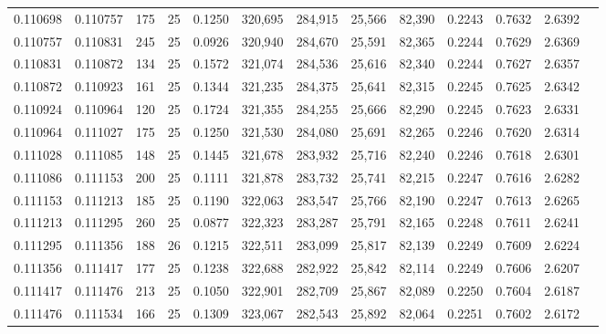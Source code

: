 \begin{tabular}{rrrrrrrrrrrrr}
0.110698 & 0.110757 &   175 &  25 &                                     0.1250 & 320,695 & 284,915 &  25,566 &  82,390 & 0.2243 & 0.7632 & 2.6392 \\
0.110757 & 0.110831 &   245 &  25 &                                     0.0926 & 320,940 & 284,670 &  25,591 &  82,365 & 0.2244 & 0.7629 & 2.6369 \\
0.110831 & 0.110872 &   134 &  25 &                                     0.1572 & 321,074 & 284,536 &  25,616 &  82,340 & 0.2244 & 0.7627 & 2.6357 \\
0.110872 & 0.110923 &   161 &  25 &                                     0.1344 & 321,235 & 284,375 &  25,641 &  82,315 & 0.2245 & 0.7625 & 2.6342 \\
0.110924 & 0.110964 &   120 &  25 &                                     0.1724 & 321,355 & 284,255 &  25,666 &  82,290 & 0.2245 & 0.7623 & 2.6331 \\
0.110964 & 0.111027 &   175 &  25 &                                     0.1250 & 321,530 & 284,080 &  25,691 &  82,265 & 0.2246 & 0.7620 & 2.6314 \\
0.111028 & 0.111085 &   148 &  25 &                                     0.1445 & 321,678 & 283,932 &  25,716 &  82,240 & 0.2246 & 0.7618 & 2.6301 \\
0.111086 & 0.111153 &   200 &  25 &                                     0.1111 & 321,878 & 283,732 &  25,741 &  82,215 & 0.2247 & 0.7616 & 2.6282 \\
0.111153 & 0.111213 &   185 &  25 &                                     0.1190 & 322,063 & 283,547 &  25,766 &  82,190 & 0.2247 & 0.7613 & 2.6265 \\
0.111213 & 0.111295 &   260 &  25 &                                     0.0877 & 322,323 & 283,287 &  25,791 &  82,165 & 0.2248 & 0.7611 & 2.6241 \\
0.111295 & 0.111356 &   188 &  26 &                                     0.1215 & 322,511 & 283,099 &  25,817 &  82,139 & 0.2249 & 0.7609 & 2.6224 \\
0.111356 & 0.111417 &   177 &  25 &                                     0.1238 & 322,688 & 282,922 &  25,842 &  82,114 & 0.2249 & 0.7606 & 2.6207 \\
0.111417 & 0.111476 &   213 &  25 &                                     0.1050 & 322,901 & 282,709 &  25,867 &  82,089 & 0.2250 & 0.7604 & 2.6187 \\
0.111476 & 0.111534 &   166 &  25 &                                     0.1309 & 323,067 & 282,543 &  25,892 &  82,064 & 0.2251 & 0.7602 & 2.6172 \\

\end{tabular}
